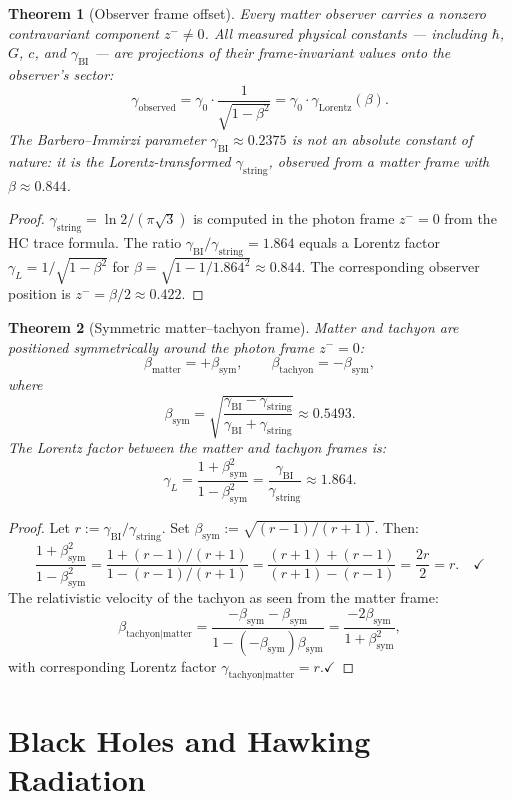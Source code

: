 \documentclass[12pt,a4paper]{article}
\newtheorem{theorem}{Theorem}[section]
\newcommand{\bsym}{\beta_{\mathrm{sym}}}
\newcommand{\gL}{\gamma_L}
\newcommand{\gstring}{\gamma_{\mathrm{string}}}
\newcommand{\gBI}{\gamma_{\mathrm{BI}}}
\newcommand{\zminus}{z^-}
\begin{document}
\begin{theorem}[Observer frame offset]\label{thm:frame-offset}
Every matter observer carries a nonzero contravariant component
$\zminus\neq 0$.
All measured physical constants --- including $\hbar$, $G$, $c$, and
$\gBI$ --- are projections of their frame-invariant values onto the
observer's sector:
\[
  \gamma_{\mathrm{observed}}
  = \gamma_0\cdot\frac{1}{\sqrt{1-\beta^2}}
  = \gamma_0\cdot\gamma_{\mathrm{Lorentz}}(\beta).
\]
The Barbero--Immirzi parameter $\gBI\approx 0.2375$ is not an absolute
constant of nature: it is the Lorentz-transformed $\gstring$, observed
from a matter frame with $\beta\approx 0.844$.
\end{theorem}

\begin{proof}
$\gstring = \ln 2/(\pi\sqrt{3})$ is computed in the photon frame
$\zminus=0$ from the HC trace formula.
The ratio $\gBI/\gstring = 1.864$ equals a Lorentz factor
$\gL = 1/\sqrt{1-\beta^2}$ for $\beta=\sqrt{1-1/1.864^2}\approx 0.844$.
The corresponding observer position is $\zminus=\beta/2\approx 0.422$.
\end{proof}

\begin{theorem}[Symmetric matter--tachyon frame]\label{thm:symmetric-frame}
Matter and tachyon are positioned symmetrically around the photon frame
$\zminus=0$:
\[
  \beta_{\mathrm{matter}} = +\bsym,\qquad
  \beta_{\mathrm{tachyon}} = -\bsym,
\]
where
\[
  \bsym = \sqrt{\frac{\gBI-\gstring}{\gBI+\gstring}}\approx 0.5493.
\]
The Lorentz factor between the matter and tachyon frames is:
\[
  \gL = \frac{1+\bsym^2}{1-\bsym^2}
      = \frac{\gBI}{\gstring}\approx 1.864.
\]
\end{theorem}

\begin{proof}
Let $r:=\gBI/\gstring$. Set $\bsym:=\sqrt{(r-1)/(r+1)}$. Then:
\[
  \frac{1+\bsym^2}{1-\bsym^2}
  =\frac{1+(r-1)/(r+1)}{1-(r-1)/(r+1)}
  =\frac{(r+1)+(r-1)}{(r+1)-(r-1)}=\frac{2r}{2}=r.\quad\checkmark
\]
The relativistic velocity of the tachyon as seen from the matter frame:
\[
  \beta_{\mathrm{tachyon}|\mathrm{matter}}
  =\frac{-\bsym-\bsym}{1-(-\bsym)\bsym}
  =\frac{-2\bsym}{1+\bsym^2},
\]
with corresponding Lorentz factor $\gamma_{\mathrm{tachyon}|\mathrm{matter}}=r$.\quad$\checkmark$
\end{proof}



\section{Black Holes and Hawking Radiation}
\label{sec:bh}
\end{document}
